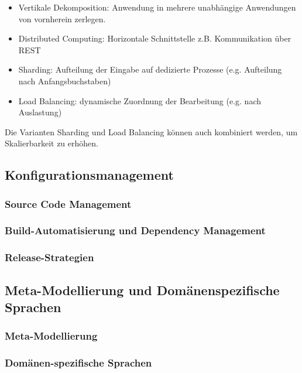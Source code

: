 \begin{itemize}
    \item Vertikale Dekomposition: Anwendung in mehrere unabhängige Anwendungen von vornherein zerlegen.
    \item Distributed Computing: Horizontale Schnittstelle z.B. Kommunikation über REST
    \item Sharding: Aufteilung der Eingabe auf dedizierte Prozesse (e.g. Aufteilung nach Anfangsbuchstaben)
    \item Load Balancing: dynamische Zuordnung der Bearbeitung (e.g. nach Auslastung)
\end{itemize}
Die Varianten Sharding und Load Balancing können auch kombiniert werden, um Skalierbarkeit zu erhöhen.

\subsection{Konfigurationsmanagement}

\subsubsection{Source Code Management}

\subsubsection{Build-Automatisierung und Dependency Management}

\subsubsection{Release-Strategien}


\subsection{Meta-Modellierung und Domänenspezifische Sprachen}

\subsubsection{Meta-Modellierung}

\subsubsection{Domänen-spezifische Sprachen}
